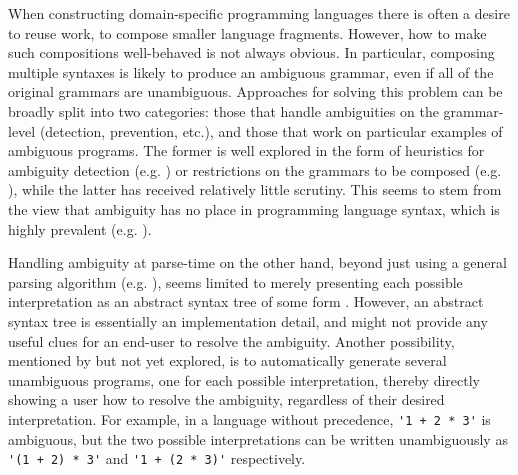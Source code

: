 \documentclass[acmsmall,review,anonymous]{acmart}\settopmatter{printfolios=true,printccs=false,printacmref=false}
\begin{document}
When constructing domain-specific programming languages there is often a desire to reuse work, to compose smaller language fragments. However, how to make such compositions well-behaved is not always obvious. In particular, composing multiple syntaxes is likely to produce an ambiguous grammar, even if all of the original grammars are unambiguous. Approaches for solving this problem can be broadly split into two categories: those that handle ambiguities on the grammar-level (detection, prevention, etc.), and those that work on particular examples of ambiguous programs. The former is well explored in the form of heuristics for ambiguity detection (e.g. \cite{bastenAmbiguityDetectionProgramming2011,axelssonAnalyzingContextFreeGrammars2008,brabrandAnalyzingAmbiguityContextFree2007}) or restrictions on the grammars to be composed (e.g. \cite{kaminskiModularWellDefinednessAnalysis2013}), while the latter has received relatively little scrutiny. This seems to stem from the view that ambiguity has no place in programming language syntax, which is highly prevalent (e.g. \cite{sudkampLanguagesMachinesIntroduction1997,ahoCompilersPrinciplesTechniques2006,webberModernProgrammingLanguages2003,cooperEngineeringCompiler2011,ginsburgAmbiguityContextFree1966}).

Handling ambiguity at parse-time on the other hand, beyond just using a general parsing algorithm (e.g. \cite{earleyEfficientContextfreeParsing1970,scottGLLParsing2010,youngerRecognitionParsingContextfree1967}), seems limited to merely presenting each possible interpretation as an abstract syntax tree of some form \cite{palmkvistCreatingDomainSpecificLanguages2019,danielssonParsingMixfixOperators2011}. However, an abstract syntax tree is essentially an implementation detail, and might not provide any useful clues for an end-user to resolve the ambiguity. Another possibility, mentioned by \citet{palmkvistCreatingDomainSpecificLanguages2019} but not yet explored, is to automatically generate several unambiguous programs, one for each possible interpretation, thereby directly showing a user how to resolve the ambiguity, regardless of their desired interpretation. For example, in a language without precedence, \verb|'1 + 2 * 3'| is ambiguous, but the two possible interpretations can be written unambiguously as \verb|'(1 + 2) * 3'| and \verb|'1 + (2 * 3)'| respectively.
\end{document}
